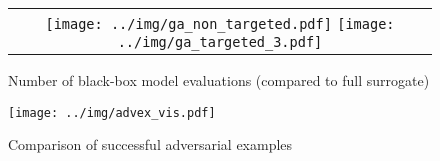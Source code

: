 \begin{figure}
    \centering
    \begin{tabular}{@{}c@{}}
        \texttt{[image: ../img/ga\_non\_targeted.pdf]}
        \texttt{[image: ../img/ga\_targeted\_3.pdf]}  \\
    \end{tabular}
    \caption{Number of black-box model evaluations (compared to full surrogate)}
    \label{fig:ga_steps}
\end{figure}

\begin{figure}
    \centering
    \texttt{[image: ../img/advex\_vis.pdf]}
    \caption{Comparison of successful adversarial examples}
    \label{fig:advex_vis}
\end{figure}
